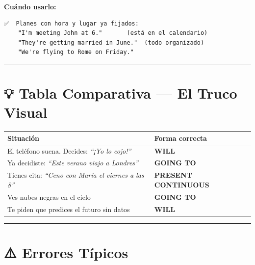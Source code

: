 \documentclass[
  spanish,
  letterpaper,
]{scrbook}
\begin{document}
\textbf{Cuándo usarlo:}

\begin{verbatim}
✅  Planes con hora y lugar ya fijados:
    "I'm meeting John at 6."       (está en el calendario)
    "They're getting married in June."  (todo organizado)
    "We're flying to Rome on Friday."
\end{verbatim}

\begin{center}\rule{0.5\linewidth}{0.5pt}\end{center}

\section{💡 Tabla Comparativa --- El Truco
Visual}\label{tabla-comparativa-el-truco-visual}

\begin{longtable}[]{@{}
  >{\raggedright\arraybackslash}p{}
  >{\raggedright\arraybackslash}p{}@{}}
\toprule\noalign{}
\begin{minipage}[b]{\linewidth}\raggedright
Situación
\end{minipage} & \begin{minipage}[b]{\linewidth}\raggedright
Forma correcta
\end{minipage} \\
\midrule\noalign{}
\endhead
\bottomrule\noalign{}
\endlastfoot
El teléfono suena. Decides: \emph{``¡Yo lo cojo!''} & \textbf{WILL} \\
Ya decidiste: \emph{``Este verano viajo a Londres''} & \textbf{GOING
TO} \\
Tienes cita: \emph{``Ceno con María el viernes a las 8''} &
\textbf{PRESENT CONTINUOUS} \\
Ves nubes negras en el cielo & \textbf{GOING TO} \\
Te piden que predices el futuro sin datos & \textbf{WILL} \\
\end{longtable}

\begin{center}\rule{0.5\linewidth}{0.5pt}\end{center}

\section{⚠️ Errores Típicos}\label{errores-tuxedpicos-3}
\end{document}
